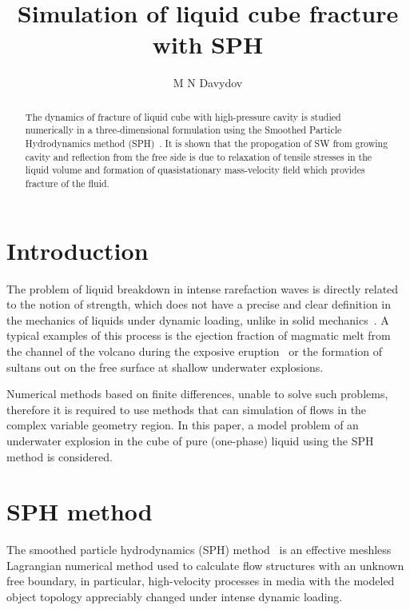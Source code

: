 \documentclass[a4paper]{jpconf}
\begin{document}
\title{Simulation of liquid cube fracture with SPH}

\author{M N Davydov}

\address{Lavrentyev Institute of Hydrodynamics of the Siberian Branch of the Russian Academy of Sciences}



\begin{abstract}
The dynamics of fracture of liquid cube with high-pressure cavity is studied numerically in a three-dimensional formulation using the Smoothed Particle Hydrodynamics method (SPH)~\cite{Monaghan2005}.  It is shown that the propogation of SW from growing cavity and reflection from the free side is due to relaxation of tensile stresses in the liquid volume and formation of quasistationary mass-velocity field which provides fracture of the fluid. 
\end{abstract}

\section{Introduction}

The problem of liquid breakdown in intense rarefaction waves is directly related to the
notion of strength, which does not have a precise and clear definition in the mechanics of liquids under dynamic
loading, unlike in solid mechanics~\cite{DavydovKedrinskii2008}. A typical examples of this process is the ejection fraction of magmatic melt from the channel of the volcano during the exposive eruption~\cite{Davydov2012a} or the formation of sultans out on the free surface at shallow underwater explosions.


Numerical methods based on finite differences, unable to solve such problems, therefore it is  required to use methods that can simulation of flows in the complex variable geometry region. In this paper, a model problem of an underwater explosion in the cube of pure (one-phase) liquid using the SPH method  is considered.

\section{SPH method}

The smoothed particle hydrodynamics (SPH) method~\cite{Monaghan1992,Monaghan2005} is an effective meshless Lagrangian numerical
method used to calculate flow structures with an unknown free boundary, in particular, high-velocity processes in
media with the modeled object topology appreciably changed under intense dynamic loading.
\end{document}
